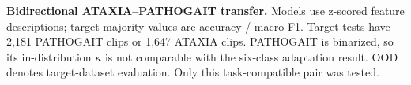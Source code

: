 \begin{importsmalltable}
\centering
\caption{\textbf{Bidirectional ATAXIA--PATHOGAIT transfer.} Models use z-scored feature descriptions; target-majority values are accuracy / macro-F1. Target tests have 2,181 PATHOGAIT clips or 1,647 ATAXIA clips. PATHOGAIT is binarized, so its in-distribution $\kappa$ is not comparable with the six-class adaptation result. OOD denotes target-dataset evaluation. Only this task-compatible pair was tested.}
\label{v2detail:tab:cross_condition_transfer}
\small
\setlength{\tabcolsep}{3.6pt}
\end{importsmalltable}
